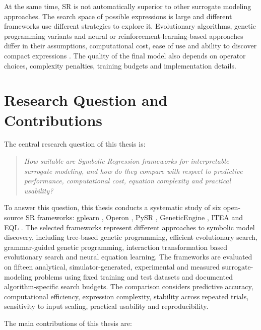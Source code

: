 \documentclass[12pt,oneside,bibtotoc,liststotoc]{scrbook}
\begin{document}
At the same time, SR is not automatically superior to other surrogate modeling approaches. The search space of possible expressions is large and different frameworks use different strategies to explore it. Evolutionary algorithms, genetic programming variants and neural or reinforcement-learning-based approaches differ in their assumptions, computational cost, ease of use and ability to discover compact expressions \cite{dong2025recent,petersen2021deep}. The quality of the final model also depends on operator choices, complexity penalties, training budgets and implementation details.

\section{Research Question and Contributions}

The central research question of this thesis is:

\begin{quote}
\emph{How suitable are Symbolic Regression frameworks for interpretable surrogate modeling, and how do they compare with respect to predictive performance, computational cost, equation complexity and practical usability?}
\end{quote}

To answer this question, this thesis conducts a systematic study of six open-source SR frameworks: gplearn \cite{stephens2026gplearn}, Operon \cite{burlacu2020operon}, PySR \cite{cranmer2023interpretable}, GeneticEngine \cite{espada2022datatypes}, ITEA \cite{defranca2021itea} and EQL \cite{sahoo2018eql}. The selected frameworks represent different approaches to symbolic model discovery, including tree-based genetic programming, efficient evolutionary search, grammar-guided genetic programming, interaction transformation based evolutionary search and neural equation learning. The frameworks are evaluated on fifteen analytical, simulator-generated, experimental and measured surrogate-modeling problems using fixed training and test datasets and documented algorithm-specific search budgets. The comparison considers predictive accuracy, computational efficiency, expression complexity, stability across repeated trials, sensitivity to input scaling, practical usability and reproducibility.

The main contributions of this thesis are:
\end{document}
